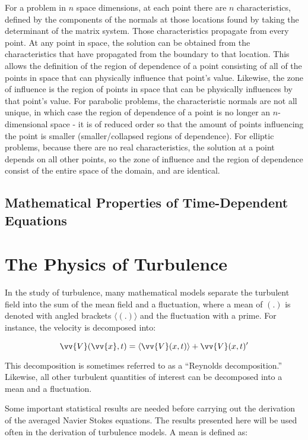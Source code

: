 \documentclass[10pt]{article}
\newcommand{\beq}{\begin{equation}}
\newcommand{\eeq}{\end{equation}}
\newcommand{\la}{\langle}
\newcommand{\ra}{\rangle}
\begin{document}
\begin{flushleft}
For a problem in \(n\) space dimensions, at each point there are \(n\) characteristics, defined by the components of the normals at those locations found by taking the determinant of the matrix system. Those characteristics propagate from every point. At any point in space, the solution can be obtained from the characteristics that have propagated from the boundary to that location. This allows the definition of the region of dependence of a point consisting of all of the points in space that can physically influence that point's value. Likewise, the zone of influence is the region of points in space that can be physically influences by that point's value. For parabolic problems, the characteristic normals are not all unique, in which case the region of dependence of a point is no longer an \(n\)-dimensional space - it is of reduced order so that the amount of points influencing the point is smaller (smaller/collapsed regions of dependence). For elliptic problems, because there are no real characteristics, the solution at a point depends on all other points, so the zone of influence and the region of dependence consist of the entire space of the domain, and are identical.

\subsection{Mathematical Properties of Time-Dependent Equations}


\section{The Physics of Turbulence}

In the study of turbulence, many mathematical models separate the turbulent field into the sum of the mean field and a fluctuation, where a mean of \((.)\) is denoted with angled brackets \(\la(.)\ra\) and the fluctuation with a prime. For instance, the velocity is decomposed into:

\beq
\vv{V}(\vv{x},t)=\la\vv{V}(x,t)\rangle+\vv{V}(x,t)'
\eeq

This decomposition is sometimes referred to as a ``Reynolds decomposition.'' Likewise, all other turbulent quantities of interest can be decomposed into a mean and a fluctuation. 

\begin{tcolorbox}[breakable]
Some important statistical results are needed before carrying out the derivation of the averaged Navier Stokes equations. The results presented here will be used often in the derivation of turbulence models. A mean is defined as:


\end{tcolorbox}
\end{flushleft}
\end{document}
